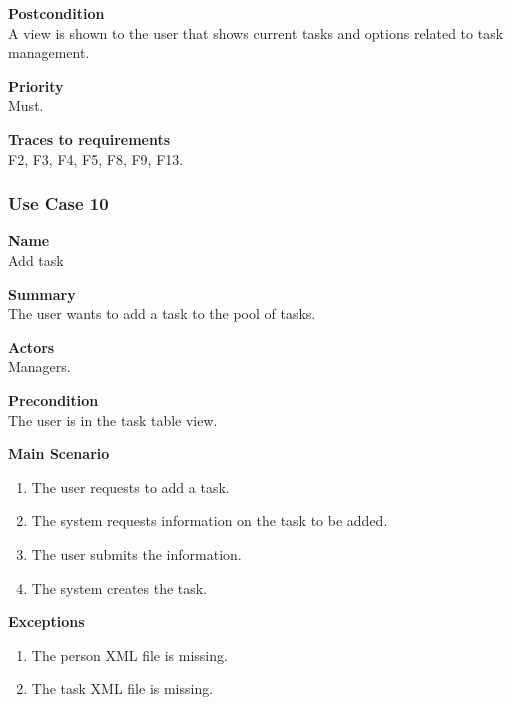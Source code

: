 \documentclass[12pt]{article}
\begin{document}
\noindent
{\bf Postcondition}\\
A view is shown to the user that shows current tasks and options related to task management.

\noindent
{\bf Priority}\\
Must.

\noindent
{\bf Traces to requirements}\\
F2, F3, F4, F5, F8, F9, F13.

\subsubsection{Use Case 10} \label{uc:10}

\noindent
{\bf Name}\\
Add task

\noindent
{\bf Summary}\\
The user wants to add a task to the pool of tasks.

\noindent
{\bf Actors}\\
Managers.

\noindent
{\bf Precondition}\\
The user is in the task table view.

\noindent
{\bf Main Scenario}\\
\vspace*{-0.35in}
\begin{enumerate}
\item The user requests to add a task.
\vspace*{-0.1in}
\item The system requests information on the task to be added.
\vspace*{-0.1in}
\item The user submits the information.
\vspace*{-0.1in}
\item The system creates the task.
\end{enumerate}
\vspace*{-0.1in}

\noindent
{\bf Exceptions}\\
\vspace*{-0.35in}
\begin{enumerate}
\item The person XML file is missing.
\vspace*{-0.1in}
\item The task XML file is missing.
\end{enumerate}
\vspace*{-0.1in}
\end{document}
